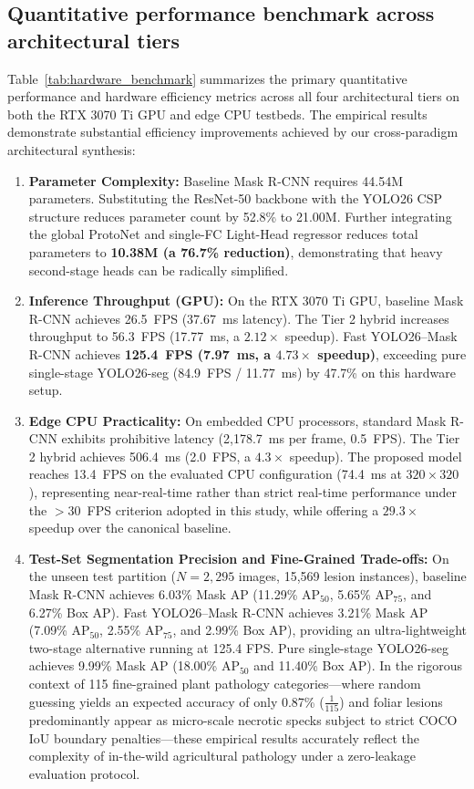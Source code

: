 \documentclass[5p,times]{elsarticle}
\begin{document}
\subsection{Quantitative performance benchmark across architectural tiers}
Table~\ref{tab:hardware_benchmark} summarizes the primary quantitative performance and hardware efficiency metrics across all four architectural tiers on both the RTX 3070 Ti GPU and edge CPU testbeds. The empirical results demonstrate substantial efficiency improvements achieved by our cross-paradigm architectural synthesis:
\begin{enumerate}
    \item \textbf{Parameter Complexity:} Baseline Mask R-CNN requires 44.54M parameters. Substituting the ResNet-50 backbone with the YOLO26 CSP structure reduces parameter count by 52.8\% to 21.00M. Further integrating the global ProtoNet and single-FC Light-Head regressor reduces total parameters to \textbf{10.38M (a 76.7\% reduction)}, demonstrating that heavy second-stage heads can be radically simplified.
    \item \textbf{Inference Throughput (GPU):} On the RTX 3070 Ti GPU, baseline Mask R-CNN achieves 26.5~FPS (37.67~ms latency). The Tier 2 hybrid increases throughput to 56.3~FPS (17.77~ms, a $2.12\times$ speedup). Fast YOLO26--Mask R-CNN achieves \textbf{125.4~FPS (7.97~ms, a $\mathbf{4.73\times}$ speedup)}, exceeding pure single-stage YOLO26-seg (84.9~FPS / 11.77~ms) by 47.7\% on this hardware setup.
    \item \textbf{Edge CPU Practicality:} On embedded CPU processors, standard Mask R-CNN exhibits prohibitive latency (2,178.7~ms per frame, 0.5~FPS). The Tier 2 hybrid achieves 506.4~ms (2.0~FPS, a $4.3\times$ speedup). The proposed model reaches 13.4~FPS on the evaluated CPU configuration (74.4~ms at $320 \times 320$), representing near-real-time rather than strict real-time performance under the $>30$~FPS criterion adopted in this study, while offering a $29.3\times$ speedup over the canonical baseline.
    \item \textbf{Test-Set Segmentation Precision and Fine-Grained Trade-offs:} On the unseen test partition ($N=2,295$ images, 15,569 lesion instances), baseline Mask R-CNN achieves 6.03\% Mask AP (11.29\% $\mathrm{AP}_{50}$, 5.65\% $\mathrm{AP}_{75}$, and 6.27\% Box AP). Fast YOLO26--Mask R-CNN achieves 3.21\% Mask AP (7.09\% $\mathrm{AP}_{50}$, 2.55\% $\mathrm{AP}_{75}$, and 2.99\% Box AP), providing an ultra-lightweight two-stage alternative running at 125.4 FPS. Pure single-stage YOLO26-seg achieves 9.99\% Mask AP (18.00\% $\mathrm{AP}_{50}$ and 11.40\% Box AP). In the rigorous context of 115 fine-grained plant pathology categories—where random guessing yields an expected accuracy of only 0.87\% ($\frac{1}{115}$) and foliar lesions predominantly appear as micro-scale necrotic specks subject to strict COCO IoU boundary penalties—these empirical results accurately reflect the complexity of in-the-wild agricultural pathology under a zero-leakage evaluation protocol.
\end{enumerate}
\end{document}
